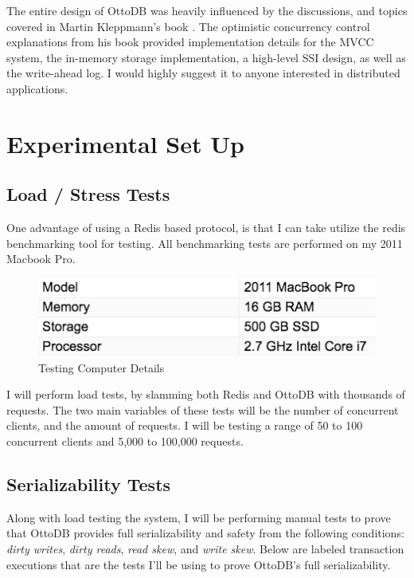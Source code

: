 \documentclass[conference]{IEEEtran}
\begin{document}
    The entire design of OttoDB was heavily influenced by the discussions, and topics covered in Martin Kleppmann's book \cite{b18}. The optimistic concurrency control explanations from his book provided  implementation details for the MVCC system, the in-memory storage implementation, a high-level SSI design, as well as the write-ahead log. I would highly suggest it to anyone interested in distributed applications.

    \section{Experimental Set Up}

    \subsection{Load / Stress Tests}

    One advantage of using a Redis based protocol, is that I can take utilize the redis benchmarking tool for testing. All benchmarking tests are performed on my 2011 Macbook Pro.

    \begin{figure}[h]
        \centering
        \includegraphics[width=\columnwidth]{figures/ComputerInfo.png}
        \caption{Testing Computer Details}
        \end{figure}

    I will perform load tests, by slamming both Redis and OttoDB with thousands of requests. The two main variables of these tests will be the number of concurrent clients, and the amount of requests. I will be testing a range of 50 to 100 concurrent clients and 5,000 to 100,000 requests.

    \subsection{Serializability Tests}

    Along with load testing the system, I will be performing manual tests to prove that OttoDB provides full serializability and safety from the following conditions: \textit{dirty writes}, \textit{dirty reads}, \textit{read skew}, and \textit{write skew}. Below are labeled transaction executions that are the tests I'll be using to prove OttoDB's full serializability.
\end{document}
